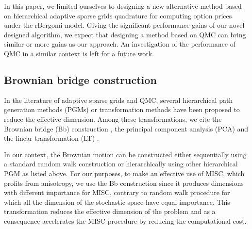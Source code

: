 \FloatBarrier


\begin{remark}
	In this paper, we limited ourselves to designing a new alternative method  based on hierarchical adaptive sparse grids quadrature for computing option prices under the rBergomi model. Giving the significant performance gains of our novel designed algorithm, we expect that designing a method based on QMC can bring similar or more gains as  our approach. An investigation of the performance of QMC in a similar context is left for a future work.
\end{remark}



\subsection{Brownian bridge construction}\label{sec:Brwonian bridge construction}
In the literature of adaptive sparse grids and  QMC, several hierarchical path generation methods (PGMs) or transformation methods have been proposed to reduce the effective dimension. Among these transformations, we cite  the Brownian
bridge (Bb)  construction \cite{morokoff1994quasi,moskowitz1996smoothness,caflisch1997valuation}, the principal component analysis (PCA)  \cite{acworth1998comparison} and the linear transformation (LT) \cite{imai2004minimizing}.

In our context, the Brownian motion can be constructed either sequentially using a standard random walk construction or hierarchically using   other hierarchical PGM as listed above. For our purposes, to make an effective use of MISC, which profits from anisotropy, we use the Bb construction since it produces  dimensions with different importance for MISC, contrary to random walk procedure for which all the dimension of the stochastic space have equal importance.  This transformation  reduces the effective dimension  of the problem and as a consequence accelerates the MISC procedure by reducing the computational cost.


